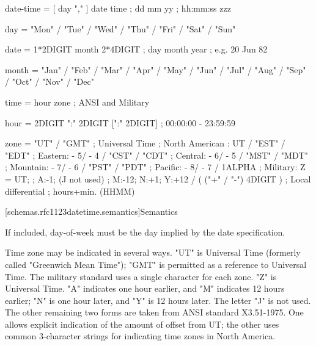 \begin{codeblock}
     date-time   =  [ day "," ] date time        ; dd mm yy
                                                 ;  hh:mm:ss zzz

     day         =  "Mon"  / "Tue" /  "Wed"  / "Thu"
                 /  "Fri"  / "Sat" /  "Sun"

     date        = 1*2DIGIT month 2*4DIGIT       ; day month year
                                                 ;  e.g. 20 Jun 82

     month       =  "Jan"  /  "Feb" /  "Mar"  /  "Apr"
                 /  "May"  /  "Jun" /  "Jul"  /  "Aug"
                 /  "Sep"  /  "Oct" /  "Nov"  /  "Dec"

     time        =  hour zone                    ; ANSI and Military

     hour        =  2DIGIT ":" 2DIGIT [":" 2DIGIT]
                                                 ; 00:00:00 - 23:59:59

     zone        =  "UT"  / "GMT"                ; Universal Time
                                                 ; North American : UT
                 /  "EST" / "EDT"                ;  Eastern:  - 5/ - 4
                 /  "CST" / "CDT"                ;  Central:  - 6/ - 5
                 /  "MST" / "MDT"                ;  Mountain: - 7/ - 6
                 /  "PST" / "PDT"                ;  Pacific:  - 8/ - 7
                 /  1ALPHA                       ; Military: Z = UT;
                                                 ;  A:-1; (J not used)
                                                 ;  M:-12; N:+1; Y:+12
                 / ( ("+" / "-") 4DIGIT )        ; Local differential
                                                 ;  hours+min. (HHMM)
\end{codeblock}


[schemas.rfc1123datetime.semantics]{Semantics}

\textbf{}

\pnum
If included, day-of-week must be the day implied by the date
specification.

\pnum
Time zone may be indicated in several ways.  "UT" is Universal Time
(formerly called "Greenwich Mean Time"); "GMT" is permitted as a
reference to Universal Time.  The military standard uses a single
character for each zone.  "Z" is Universal Time.  "A" indicates one
hour earlier, and "M" indicates 12 hours earlier; "N" is one hour
later, and "Y" is 12 hours later.  The letter "J" is not used.  The
other remaining two forms are taken from ANSI standard X3.51-1975.
One allows explicit indication of the amount of offset from UT; the
other uses common 3-character strings for indicating time zones in
North America.

